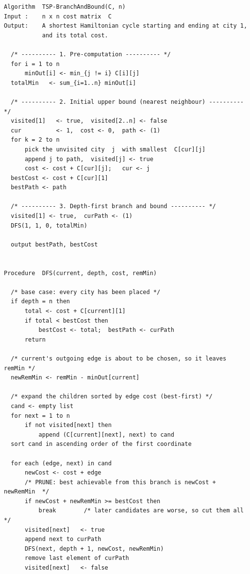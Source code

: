 \documentclass[11pt]{article}
\begin{document}
\begin{lstlisting}
Algorithm  TSP-BranchAndBound(C, n)
Input :    n x n cost matrix  C
Output:    A shortest Hamiltonian cycle starting and ending at city 1,
           and its total cost.

  /* ---------- 1. Pre-computation ---------- */
  for i = 1 to n
      minOut[i] <- min_{j != i} C[i][j]
  totalMin   <- sum_{i=1..n} minOut[i]

  /* ---------- 2. Initial upper bound (nearest neighbour) ---------- */
  visited[1]   <- true,  visited[2..n] <- false
  cur          <- 1,  cost <- 0,  path <- (1)
  for k = 2 to n
      pick the unvisited city  j  with smallest  C[cur][j]
      append j to path,  visited[j] <- true
      cost <- cost + C[cur][j];   cur <- j
  bestCost <- cost + C[cur][1]
  bestPath <- path

  /* ---------- 3. Depth-first branch and bound ---------- */
  visited[1] <- true,  curPath <- (1)
  DFS(1, 1, 0, totalMin)

  output bestPath, bestCost


Procedure  DFS(current, depth, cost, remMin)

  /* base case: every city has been placed */
  if depth = n then
      total <- cost + C[current][1]
      if total < bestCost then
          bestCost <- total;  bestPath <- curPath
      return

  /* current's outgoing edge is about to be chosen, so it leaves remMin */
  newRemMin <- remMin - minOut[current]

  /* expand the children sorted by edge cost (best-first) */
  cand <- empty list
  for next = 1 to n
      if not visited[next] then
          append (C[current][next], next) to cand
  sort cand in ascending order of the first coordinate

  for each (edge, next) in cand
      newCost <- cost + edge
      /* PRUNE: best achievable from this branch is newCost + newRemMin  */
      if newCost + newRemMin >= bestCost then
          break        /* later candidates are worse, so cut them all     */
      visited[next]   <- true
      append next to curPath
      DFS(next, depth + 1, newCost, newRemMin)
      remove last element of curPath
      visited[next]   <- false
\end{lstlisting}
\end{document}
